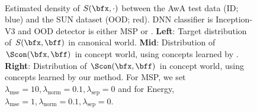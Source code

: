 \begin{figure}[tbp]
\centering
{}\hfill
{}\hfill
{} \\
\hfill
{}\hfill
{}
\caption{Estimated density of $S(\bfx, \cdot)$ between the AwA test data (ID; blue) and the SUN dataset (OOD; red). DNN classifier is Inception-V3 and OOD detector is either MSP \cite{hendrycks2016msp} or \cite{liu2020energy}.
\textbf{Left}: Target distribution of $S(\bfx, \bff)$ in canonical world. 
\textbf{Mid}: Distribution of $\Scon(\bfx, \bff)$ in concept world, using concepts learned by \cite{yeh2019completeness}.
\textbf{Right}: Distribution of $\Scon(\bfx, \bff)$ in concept world, using concepts learned by our method.
For MSP, we set $\lambda_\textrm{mse} = 10, \lambda_\textrm{norm} = 0.1, \lambda_\textrm{sep} = 0$ and for Energy, $\lambda_\textrm{mse} = 1, \lambda_\textrm{norm} = 0.1, \lambda_\textrm{sep} = 0$.}
\label{fig:score-distribution}
\end{figure}

